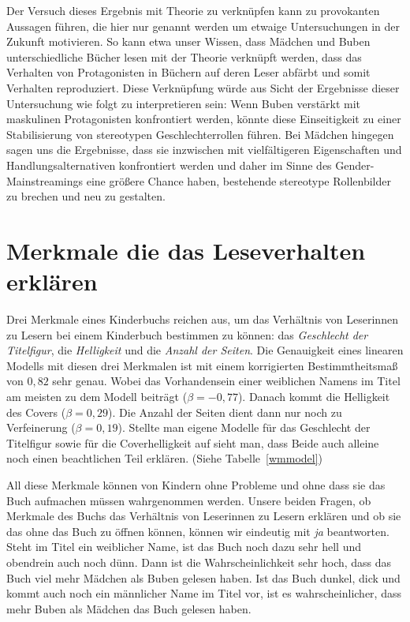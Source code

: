 Der Versuch dieses Ergebnis mit Theorie zu verknüpfen kann zu
provokanten Aussagen führen, die hier nur genannt werden um etwaige
Untersuchungen in der Zukunft motivieren. So kann etwa unser Wissen,
dass Mädchen und Buben unterschiedliche Bücher lesen mit der Theorie
verknüpft werden, dass das Verhalten von Protagonisten in Büchern auf
deren Leser abfärbt und somit Verhalten reproduziert. Diese Verknüpfung
würde aus Sicht der Ergebnisse dieser Untersuchung wie folgt zu
interpretieren sein: Wenn Buben verstärkt mit maskulinen Protagonisten
konfrontiert werden, könnte diese Einseitigkeit zu einer Stabilisierung
von stereotypen Geschlechterrollen führen. Bei Mädchen hingegen sagen
uns die Ergebnisse, dass sie inzwischen mit vielfältigeren Eigenschaften
und Handlungsalternativen konfrontiert werden und daher im Sinne des
Gender-Mainstreamings eine größere Chance haben, bestehende stereotype
Rollenbilder zu brechen und neu zu gestalten.

\chapter{Merkmale die das Leseverhalten erklären}

Drei Merkmale eines Kinderbuchs reichen aus, um das Verhältnis von
Leserinnen zu Lesern bei einem Kinderbuch bestimmen zu können: das
\emph{Geschlecht der Titelfigur}, die \emph{Helligkeit} und die
\emph{Anzahl der Seiten}. Die Genauigkeit eines linearen Modells mit
diesen drei Merkmalen ist mit einem korrigierten Bestimmtheitsmaß von
$0{,}82$ sehr genau. Wobei das Vorhandensein einer weiblichen Namens im
Titel am meisten zu dem Modell beiträgt ($\beta=-0{,}77$). Danach kommt
die Helligkeit des Covers ($\beta=0{,}29$). Die Anzahl der Seiten dient
dann nur noch zu Verfeinerung ($\beta=0{,}19$). Stellte man eigene
Modelle für das Geschlecht der Titelfigur sowie für die Coverhelligkeit
auf sieht man, dass Beide auch alleine noch einen beachtlichen Teil
erklären. (Siehe Tabelle~\ref{wmmodel})

All diese Merkmale können von Kindern ohne Probleme und ohne dass sie
das Buch aufmachen müssen wahrgenommen werden. Unsere beiden Fragen, ob
Merkmale des Buchs das Verhältnis von Leserinnen zu Lesern erklären und
ob sie das ohne das Buch zu öffnen können, können wir eindeutig mit
\emph{ja} beantworten. Steht im Titel ein weiblicher Name, ist das Buch
noch dazu sehr hell und obendrein auch noch dünn. Dann ist die
Wahrscheinlichkeit sehr hoch, dass das Buch viel mehr Mädchen als Buben
gelesen haben. Ist das Buch dunkel, dick und kommt auch noch ein
männlicher Name im Titel vor, ist es wahrscheinlicher, dass mehr Buben
als Mädchen das Buch gelesen haben.

